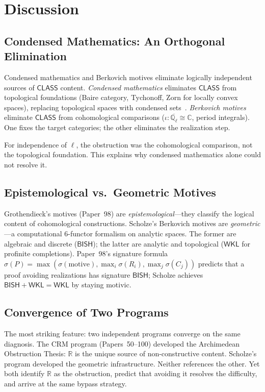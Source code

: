 \documentclass[11pt,a4paper]{article}
\theoremstyle{plain}
\theoremstyle{definition}
\newcommand{\BISH}{\textsf{BISH}}
\newcommand{\WKL}{\textsf{WKL}}
\newcommand{\CLASS}{\textsf{CLASS}}
\newcommand{\Q}{\mathbb{Q}}
\newcommand{\R}{\mathbb{R}}
\newcommand{\C}{\mathbb{C}}
\newcommand{\sig}{\sigma}
\begin{document}
\section{Discussion}\label{sec:discussion}

\subsection{Condensed Mathematics: An Orthogonal Elimination}

Condensed mathematics and Berkovich motives eliminate logically independent sources of $\CLASS$ content. \emph{Condensed mathematics} eliminates $\CLASS$ from topological foundations (Baire category, Tychonoff, Zorn for locally convex spaces), replacing topological spaces with condensed sets~\cite{scholze-condensed}. \emph{Berkovich motives} eliminate $\CLASS$ from cohomological comparisons ($\iota: \overline{\Q_\ell} \cong \C$, period integrals). One fixes the target categories; the other eliminates the realization step.

For independence of $\ell$, the obstruction was the cohomological comparison, not the topological foundation. This explains why condensed mathematics alone could not resolve it.

\subsection{Epistemological vs.\ Geometric Motives}

Grothendieck's motives (Paper~98) are \emph{epistemological}---they classify the logical content of cohomological constructions. Scholze's Berkovich motives are \emph{geometric}---a computational 6-functor formalism on analytic spaces. The former are algebraic and discrete ($\BISH$); the latter are analytic and topological ($\WKL$ for profinite completions). Paper~98's signature formula $\sig(P) = \max(\sig(\text{motive}), \max_i \sig(R_i), \max_j \sig(C_j))$ predicts that a proof avoiding realizations has signature $\BISH$; Scholze achieves $\BISH + \WKL = \WKL$ by staying motivic.

\subsection{Convergence of Two Programs}

The most striking feature: two independent programs converge on the same diagnosis. The CRM program (Papers~50--100) developed the Archimedean Obstruction Thesis: $\R$ is the unique source of non-constructive content. Scholze's program developed the geometric infrastructure. Neither references the other. Yet both identify $\R$ as the obstruction, predict that avoiding it resolves the difficulty, and arrive at the same bypass strategy.
\end{document}
